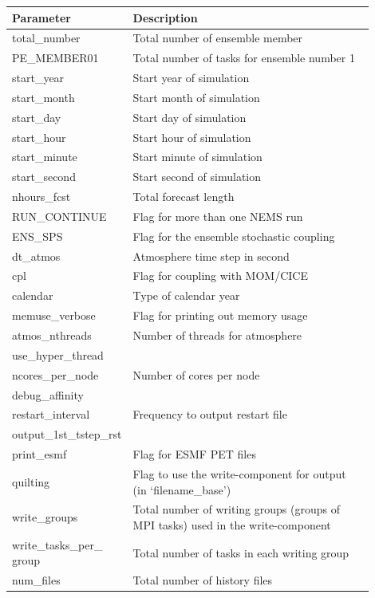 \documentclass[11pt,fleqn]{report}              %
\begin{document}
{
\fontsize{9}{11}\selectfont
\begin{longtable}{p{0.2\linewidth} | p{0.7\linewidth}  }
\hline
\hline
Parameter & Description \\
\hline
 total\_number & Total number of ensemble member   \\
 PE\_MEMBER01 & Total number of tasks for ensemble number 1  \\
 start\_year & Start year of simulation  \\
 start\_month & Start month of simulation  \\
 start\_day & Start day of simulation  \\
 start\_hour & Start hour of simulation \\
 start\_minute & Start minute of simulation \\
 start\_second & Start second of simulation \\
 nhours\_fcst & Total forecast length \\
 RUN\_CONTINUE & Flag for more than one NEMS run   \\
 ENS\_SPS & Flag for the ensemble stochastic coupling  \\
 dt\_atmos & Atmosphere time step in second \\
 cpl & Flag for coupling with MOM/CICE  \\
 calendar & Type of calendar year \\
 memuse\_verbose & Flag for printing out memory usage \\
 atmos\_nthreads & Number of threads for atmosphere  \\
 use\_hyper\_thread &  \\
 ncores\_per\_node & Number of cores per node   \\
 debug\_affinity & \\
 restart\_interval & Frequency to output restart file   \\
 output\_1st\_tstep\_rst &   \\
 print\_esmf & Flag for ESMF PET files  \\
 quilting & Flag to use the write-component for output (in `filename\_base')  \\
\hdashline
 write\_groups & Total number of writing groups (groups of MPI tasks) used in the write-component    \\
 write\_tasks\_per\_ group & Total number of tasks in each writing group  \\
 num\_files & Total number of history files   \\

\end{longtable}}
\end{document}
